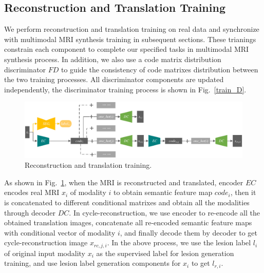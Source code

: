 \documentclass[letterpaper]{article} %
\begin{document}
\subsection{Reconstruction and Translation Training}
We perform reconstruction and translation training on real data and synchronize with multimodal MRI synthesis training in subsequent sections. These trianings constrain each component to complete our specified tasks in multimodal MRI synthesis process. In addition, we also use a code matrix distribution discriminator $FD$ to guide the consistency of code matrixes distribution between the two training processes. All discriminator components are updated independently, the discriminator training process is shown in Fig.~\ref{train_D}.

\begin{figure}
	\centering
	\includegraphics[width=0.95\columnwidth]{figures/trans_train}
	\caption{Reconstruction and translation training.}
	\label{trans_train}
\end{figure}

As shown in Fig.~\ref{trans_train}, when the MRI is reconstructed and translated, encoder $EC$ encodes real MRI $x_i$ of modality $i$ to obtain semantic feature map $code_{i}$, then it is concatenated to different conditional matrixes and obtain all the modalities through decoder $DC$. In cycle-reconstruction, we use encoder to re-encode all the obtained translation images, concatenate all re-encoded semantic feature maps with conditional vector of modality $i$, and finally decode them by decoder to get cycle-reconstruction image $x_{rc,j,i}$. In the above process, we use the lesion label $l_i$ of original input modality $x_i$ as the supervised label for lesion generation training, and use lesion label generation components for $x_i$ to get $l_{r,i}$.
\end{document}
